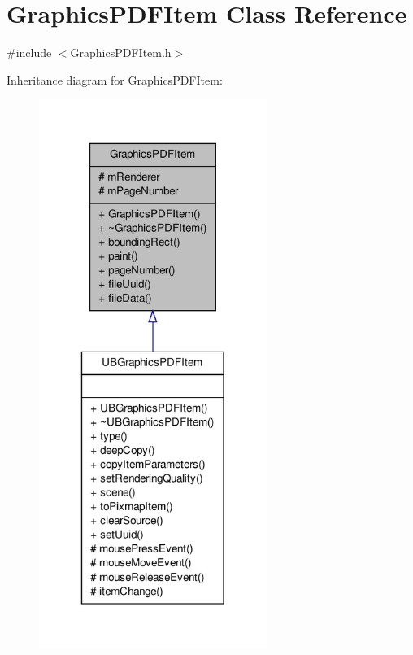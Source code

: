 \hypertarget{class_graphics_p_d_f_item}{\section{Graphics\-P\-D\-F\-Item Class Reference}
\label{d9/d97/class_graphics_p_d_f_item}
}


{\ttfamily \#include $<$Graphics\-P\-D\-F\-Item.\-h$>$}



Inheritance diagram for Graphics\-P\-D\-F\-Item\-:
\nopagebreak
\begin{figure}[H]
\begin{center}
\leavevmode
\includegraphics[width=210pt]{d1/dd1/class_graphics_p_d_f_item__inherit__graph}
\end{center}
\end{figure}


